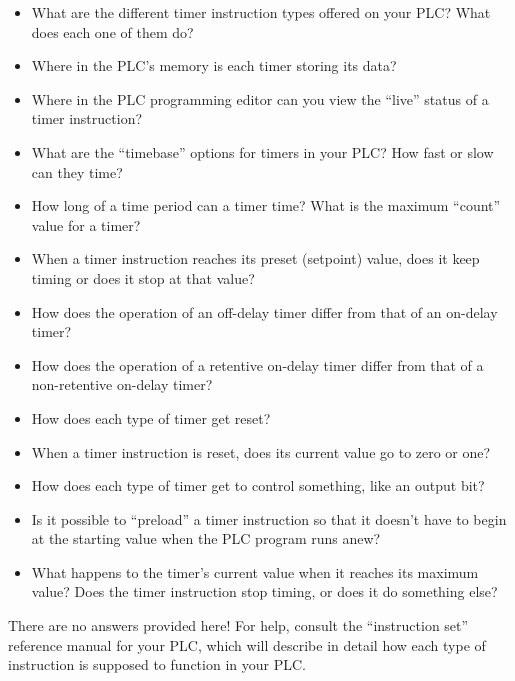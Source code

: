 \begin{itemize}
\item{} What are the different timer instruction types offered on your PLC?  What does each one of them do?
\item{} Where in the PLC's memory is each timer storing its data?
\item{} Where in the PLC programming editor can you view the ``live'' status of a timer instruction?
\item{} What are the ``timebase'' options for timers in your PLC?  How fast or slow can they time?
\item{} How long of a time period can a timer time?  What is the maximum ``count'' value for a timer?
\item{} When a timer instruction reaches its preset (setpoint) value, does it keep timing or does it stop at that value?
\item{} How does the operation of an off-delay timer differ from that of an on-delay timer?
\item{} How does the operation of a retentive on-delay timer differ from that of a non-retentive on-delay timer?
\item{} How does each type of timer get reset?
\item{} When a timer instruction is reset, does its current value go to zero or one?
\item{} How does each type of timer get to control something, like an output bit?
\item{} Is it possible to ``preload'' a timer instruction so that it doesn't have to begin at the starting value when the PLC program runs anew?
\item{} What happens to the timer's current value when it reaches its maximum value?  Does the timer instruction stop timing, or does it do something else?
\end{itemize}







There are no answers provided here!  For help, consult the ``instruction set'' reference manual for your PLC, which will describe in detail how each type of instruction is supposed to function in your PLC.







